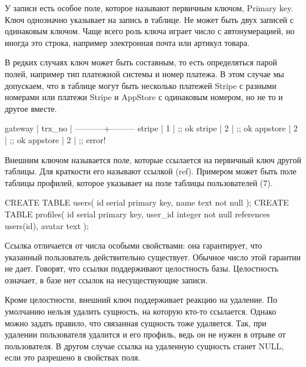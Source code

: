 У записи есть особое поле, которое называют первичным ключом, Primary key. Ключ однозначно указывает на запись в таблице. Не может быть двух записей с одинаковым ключом. Чаще всего роль ключа играет число с автонумерацией, но иногда это строка, например электронная почта или артикул товара.

В редких случаях ключ может быть составным, то есть определяться парой полей, например тип платежной системы и номер платежа. В этом случае мы допускаем, что в таблице могут быть несколько платежей Stripe с разными номерами или платежи Stripe и AppStore с одинаковым номером, но не то и другое вместе.

\begin{english}
  \begin{text}
 gateway   | trx_no |
-----------+---------
 stripe    | 1      | ;; ok
 stripe    | 2      | ;; ok
 appstore  | 2      | ;; ok
 appstore  | 2      | ;; error!
  \end{text}
\end{english}

Внешним ключом называется поле, которые ссылается на первичный ключ другой таблицы. Для краткости его называют ссылкой (ref). Примером может быть поле  таблицы профилей, которое указывает на поле  таблицы пользователей \coderef(7).

\begin{english}
  \begin{sql/lines}
CREATE TABLE users(
    id   serial primary key,
    name text not null
);
CREATE TABLE profiles(
    id      serial primary key,
    user_id integer not null references users(id),
    avatar  text
);
  \end{sql/lines}
\end{english}

Ссылка отличается от числа особыми свойствами: она гарантирует, что указанный пользователь действительно существует. Обычное число этой гарантии не дает. Говорят, что ссылки поддерживают целостность базы. Целостность означает, в базе нет ссылок на несуществующие записи.

Кроме целостности, внешний ключ поддерживает реакцию на удаление. По умолчанию нельзя удалить сущность, на которую кто-то ссылается. Однако можно задать правило, что связанная сущность тоже удаляется. Так, при удалении пользователя удалится и его профиль, ведь он не нужен в отрыве от пользователя. В другом случае ссылка на удаленную сущность станет NULL, если это разрешено в свойствах поля.

